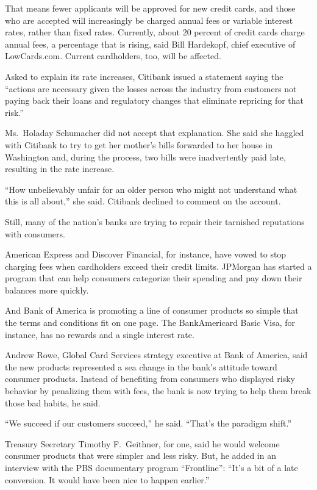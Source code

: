 ﻿\documentclass[12pt]{article}
\begin{document}
That means fewer applicants will be approved for new credit cards, and those who are accepted will
increasingly be charged annual fees or variable interest rates, rather than fixed rates. Currently,
about 20 percent of credit cards charge annual fees, a percentage that is rising, said Bill
Hardekopf, chief executive of LowCards.com. Current cardholders, too, will be affected.

Asked to explain its rate increases, Citibank issued a statement saying the ``actions are necessary
given the losses across the industry from customers not paying back their loans and regulatory
changes that eliminate repricing for that risk.''

Ms.~Holaday Schumacher did not accept that explanation. She said she haggled with Citibank to try to
get her mother's bills forwarded to her house in Washington and, during the process, two bills were
inadvertently paid late, resulting in the rate increase.

``How unbelievably unfair for an older person who might not understand what this is all about,'' she
said. Citibank declined to comment on the account.

Still, many of the nation's banks are trying to repair their tarnished reputations with consumers.

American Express and Discover Financial, for instance, have vowed to stop charging fees when
cardholders exceed their credit limits. JPMorgan has started a program that can help consumers
categorize their spending and pay down their balances more quickly.

And Bank of America is promoting a line of consumer products so simple that the terms and conditions
fit on one page. The BankAmericard Basic Visa, for instance, has no rewards and a single interest
rate.

Andrew Rowe, Global Card Services strategy executive at Bank of America, said the new products
represented a sea change in the bank's attitude toward consumer products. Instead of benefiting from
consumers who displayed risky behavior by penalizing them with fees, the bank is now trying to help
them break those bad habits, he said.

``We succeed if our customers succeed,'' he said. ``That's the paradigm shift.''

Treasury Secretary Timothy F.~Geithner, for one, said he would welcome consumer products that were
simpler and less risky. But, he added in an interview with the PBS documentary program
``Frontline'': ``It's a bit of a late conversion. It would have been nice to happen earlier.''
\end{document}
